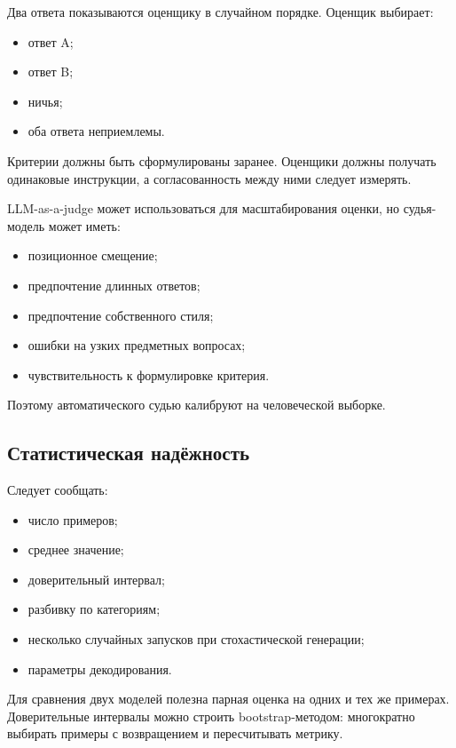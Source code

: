 \documentclass[12pt,a4paper]{article}
\newcommand{\1}{\mathbf{1}}
\theoremstyle{definition}
\theoremstyle{remark}
\begin{document}
Два ответа показываются оценщику в случайном порядке. Оценщик выбирает:

\begin{itemize}
    \item ответ A;
    \item ответ B;
    \item ничья;
    \item оба ответа неприемлемы.
\end{itemize}

Критерии должны быть сформулированы заранее. Оценщики должны получать
одинаковые инструкции, а согласованность между ними следует измерять.

LLM-as-a-judge может использоваться для масштабирования оценки, но
судья-модель может иметь:

\begin{itemize}
    \item позиционное смещение;
    \item предпочтение длинных ответов;
    \item предпочтение собственного стиля;
    \item ошибки на узких предметных вопросах;
    \item чувствительность к формулировке критерия.
\end{itemize}

Поэтому автоматического судью калибруют на человеческой выборке.

\subsection{Статистическая надёжность}

Следует сообщать:

\begin{itemize}
    \item число примеров;
    \item среднее значение;
    \item доверительный интервал;
    \item разбивку по категориям;
    \item несколько случайных запусков при стохастической генерации;
    \item параметры декодирования.
\end{itemize}

Для сравнения двух моделей полезна парная оценка на одних и тех же
примерах. Доверительные интервалы можно строить bootstrap-методом:
многократно выбирать примеры с возвращением и пересчитывать метрику.
\end{document}
